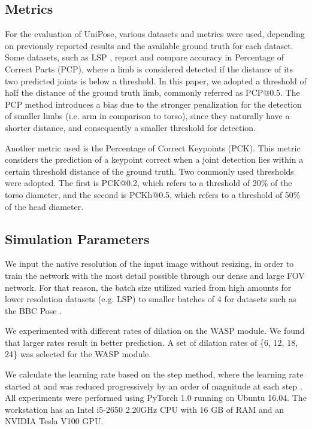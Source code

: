 \documentclass[10pt,twocolumn,letterpaper]{article}
\begin{document}
\subsection{Metrics}
For the evaluation of UniPose, various datasets and metrics were used, depending on previously reported results and the available ground truth for each dataset.
Some datasets, such as LSP \cite{LSP}, report and compare accuracy in Percentage of Correct Parts (PCP), where a limb is considered detected if the distance of its two predicted joints is below a threshold. In this paper, we adopted a threshold of half the distance of the ground truth limb, commonly referred as PCP@0.5.
The PCP method introduces a bias due to the stronger penalization for the detection of smaller limbs (i.e. arm in comparison to torso), since they naturally have a shorter distance, and consequently a smaller threshold for detection.

Another metric used is the Percentage of Correct Keypoints (PCK). This metric considers the prediction of a keypoint correct when a joint detection lies within a certain threshold distance of the ground truth. 
Two commonly used thresholds were adopted. The first is PCK@0.2, which refers to a threshold of 20\% of the torso diameter, and the second is PCKh@0.5, which refers to a threshold of 50\% of the head diameter.

\subsection{Simulation Parameters}
We input the native resolution of the input image without resizing, in order to train the network with the most detail possible through our dense and large FOV network. 
For that reason, the batch size utilized varied from high amounts for lower resolution datasets (e.g. LSP) to smaller batches of 4 for datasets such as the BBC Pose \cite{BBC}.

We experimented with different rates of dilation on the WASP module. We found that larger rates result in better prediction. A set of dilation rates of  \{6, 12, 18, 24\} was selected for the WASP module.

We calculate the learning rate based on the step method, where the learning rate started at  and was reduced progressively by an order of magnitude at each step \cite{Parsenet}. 
All experiments were performed using PyTorch 1.0 running on Ubuntu 16.04. The workstation has an Intel i5-2650 2.20GHz CPU with 16 GB of RAM and an NVIDIA Tesla V100 GPU.
\end{document}
